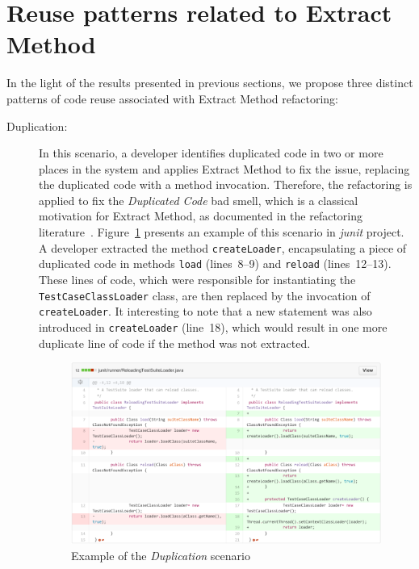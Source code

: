 \section{Reuse patterns related to Extract Method}
\label{reusepatterns}



In the light of the results presented in previous sections, we propose three distinct patterns of code reuse associated with Extract Method refactoring:
\begin{description}
\item[Duplication:] In this scenario, a developer identifies duplicated code in two or more places in the system and applies Extract Method to fix the issue, replacing the duplicated code with a method invocation.
Therefore, the refactoring is applied to fix the \emph{Duplicated Code} bad smell, which is a classical motivation for Extract Method, as documented in the refactoring literature~\citep{Fowler:1999}.
Figure~\ref{iexdup} presents an example of this scenario in \textit{junit} project. A developer extracted the method \texttt{createLoader}, encapsulating a piece of duplicated code in methods \texttt{load} (lines~8--9) and \texttt{reload} (lines~12--13).
These lines of code, which were responsible for instantiating the \texttt{TestCaseClassLoader} class, are then replaced by the invocation of \texttt{createLoader}. It interesting to note that a new statement was also introduced in \texttt{createLoader} (line~18), which would result in one more duplicate line of code if the method was not extracted.

\begin{figure}[htbp]\centering
\includegraphics[width=1\textwidth]{img/ch5/dup.pdf}
\caption{Example of the \textit{Duplication} scenario}
\label{iexdup}
\end{figure}  



\end{description}
